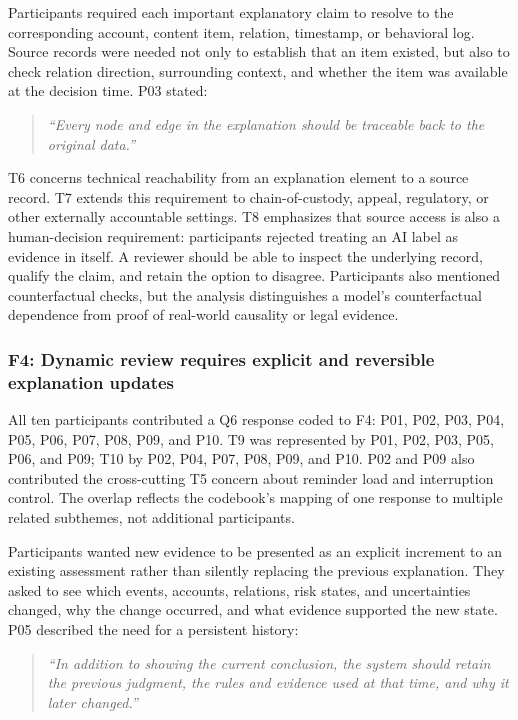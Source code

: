 Participants required each important explanatory claim to resolve to the
corresponding account, content item, relation, timestamp, or behavioral log.
Source records were needed not only to establish that an item existed, but also
to check relation direction, surrounding context, and whether the item was
available at the decision time. P03 stated:

\begin{quote}
\emph{``Every node and edge in the explanation should be traceable back to the original data.''}
\end{quote}

T6 concerns technical reachability from an explanation element to a source
record. T7 extends this requirement to chain-of-custody, appeal, regulatory,
or other externally accountable settings. T8 emphasizes that source access is
also a human-decision requirement: participants rejected treating an AI label
as evidence in itself. A reviewer should be able to inspect the underlying
record, qualify the claim, and retain the option to disagree. Participants also
mentioned counterfactual checks, but the analysis distinguishes a model's
counterfactual dependence from proof of real-world causality or legal evidence.

\subsubsection{F4: Dynamic review requires explicit and reversible explanation updates}
\label{sec:f4}

All ten participants contributed a Q6 response coded to F4: P01, P02, P03,
P04, P05, P06, P07, P08, P09, and P10. T9 was represented by P01, P02, P03,
P05, P06, and P09; T10 by P02, P04, P07, P08, P09, and P10. P02 and P09
also contributed the cross-cutting T5 concern about reminder load and
interruption control. The overlap reflects the codebook's mapping of one
response to multiple related subthemes, not additional participants.

Participants wanted new evidence to be presented as an explicit increment to an
existing assessment rather than silently replacing the previous explanation.
They asked to see which events, accounts, relations, risk states, and
uncertainties changed, why the change occurred, and what evidence supported the
new state. P05 described the need for a persistent history:

\begin{quote}
\emph{``In addition to showing the current conclusion, the system should retain the previous judgment, the rules and evidence used at that time, and why it later changed.''}
\end{quote}


